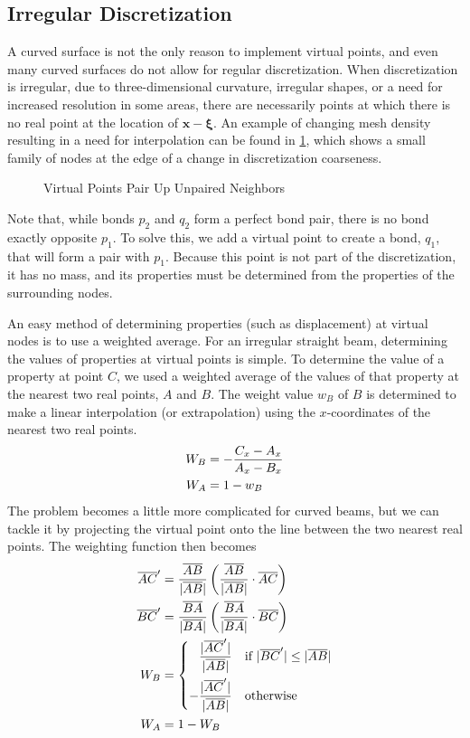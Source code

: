 \subsection{Irregular Discretization}
A curved surface is not the only reason to implement virtual points, and even many curved surfaces do not allow for regular discretization.
When discretization is irregular, due to three-dimensional curvature, irregular shapes, or a need for increased resolution in some areas, there are necessarily points at which there is no real point at the location of $\mathbf{x} - \boldsymbol{\xi}$.
An example of changing mesh density resulting in a need for interpolation can be found in \cref{fig:virtualpoint}, which shows a small family of nodes at the edge of a change in discretization coarseness.
%
\begin{figure}[htbp]
  \vspace{10mm}
  \centering
  
  \caption{Virtual Points Pair Up Unpaired Neighbors}
  \label{fig:virtualpoint}
\end{figure}
%
Note that, while bonds \(p_2\) and \(q_2\) form a perfect bond pair, there is no bond exactly opposite \(p_1\).
To solve this, we add a virtual point to create a bond, \(q_1\), that will form a pair with \(p_1\).
Because this point is not part of the discretization, it has no mass, and its properties must be determined from the properties of the surrounding nodes.

An easy method of determining properties (such as displacement) at virtual nodes is to use a weighted average.
For an irregular straight beam, determining the values of properties at virtual points is simple. 
To determine the value of a property at point $C$, we used a weighted average of the values of that property at the nearest two real points, $A$ and $B$.
The weight value $w_B$ of $B$ is determined to make a linear interpolation (or extrapolation) using the $x$-coordinates of the nearest two real points.
\begin{align}
W_B &= -\frac{C_x-A_x}{A_x-B_x}\notag\\
W_A &= 1-w_B\notag
\end{align}
The problem becomes a little more complicated for curved beams, but we can tackle it by projecting the virtual point onto the line between the two nearest real points.
The weighting function then becomes
\begin{align}
\overline{AC}' &= \frac{\overline{AB}}{|\overline{AB}|}\left(\frac{\overline{AB}}{|\overline{AB}|} \cdot \overline{AC}\right)\notag\\
\overline{BC}' &= \frac{\overline{BA}}{|\overline{BA}|}\left(\frac{\overline{BA}}{|\overline{BA}|}\cdot\overline{BC}\right)\notag\\
W_B &= 
  \begin{dcases}
    \phantom{-}\frac{|\overline{AC}'|}{|\overline{AB}|} & \text{if } |\overline{BC}'| \leq |\overline{AB}|\\
    -\frac{|\overline{AC}'|}{|\overline{AB}|} &\text{otherwise}
  \end{dcases}\notag\\
W_A &= 1-W_B\notag
\end{align}

